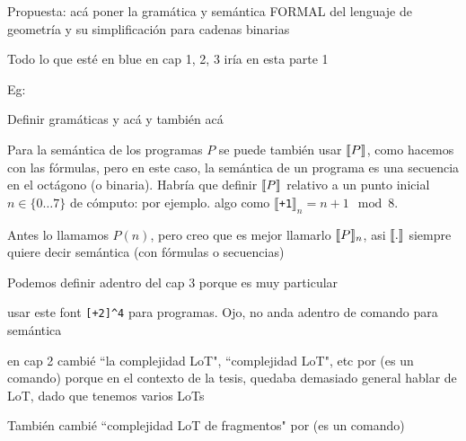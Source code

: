 

    \color{blue}
    Propuesta: acá poner la gramática y semántica FORMAL del lenguaje de geometría y su simplificación para cadenas binarias

    Todo lo que esté en blue en cap 1, 2, 3 iría en esta parte 1

    Eg:

    Definir  gramáticas   \gramgeo y    \grambin acá y también \mdlbin acá

    Para la semántica de los programas $P$ se puede también usar $\llbracket P\rrbracket$, como hacemos con las fórmulas, pero en este caso, la semántica de un programa es una secuencia en el octágono (o binaria). Habría que definir $\llbracket P\rrbracket$ relativo a un punto inicial $n\in\{0\dots 7\}$ de cómputo: 
    por ejemplo. algo como $\llbracket$\verb#+1#$\rrbracket_n= n+1 \mod 8$.%

    Antes lo llamamos $P(n)$, pero creo que es mejor llamarlo $\llbracket P\rrbracket_n$, asi $\llbracket .\rrbracket$ siempre quiere decir semántica (con fórmulas o secuencias)

    Podemos definir \mdlbinfrag adentro del cap 3 porque es muy particular

    usar este font \verb#[+2]^4# para programas. Ojo, no anda adentro de comando para semántica

    en cap 2 cambié ``la complejidad LoT", ``complejidad LoT", etc por  \mdlbin (es un comando) porque en el contexto de la tesis, quedaba demasiado general hablar de LoT, dado que tenemos varios LoTs

    También cambié  ``complejidad LoT de fragmentos" por  \mdlbinfrag (es un comando)




    \color{black}
